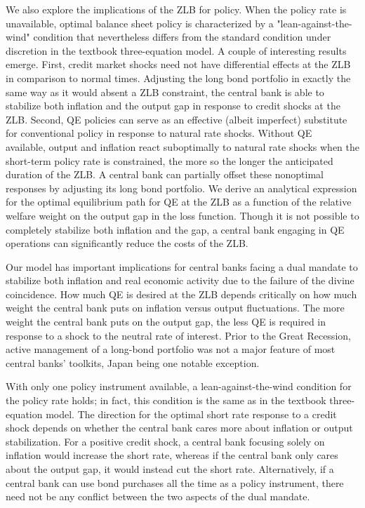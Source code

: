 \documentclass[10pt]{article}
\begin{document}
We also explore the implications of the ZLB for policy. When the policy rate is unavailable, optimal balance sheet policy is characterized by a "lean-against-the-wind" condition that nevertheless differs from the standard condition under discretion in the textbook three-equation model. A couple of interesting results emerge. First, credit market shocks need not have differential effects at the ZLB in comparison to normal times. Adjusting the long bond portfolio in exactly the same way as it would absent a ZLB constraint, the central bank is able to stabilize both inflation and the output gap in response to credit shocks at the ZLB. Second, QE policies can serve as an effective (albeit imperfect) substitute for conventional policy in response to natural rate shocks. Without QE\\
available, output and inflation react suboptimally to natural rate shocks when the short-term policy rate is constrained, the more so the longer the anticipated duration of the ZLB. A central bank can partially offset these nonoptimal responses by adjusting its long bond portfolio. We derive an analytical expression for the optimal equilibrium path for QE at the ZLB as a function of the relative welfare weight on the output gap in the loss function. Though it is not possible to completely stabilize both inflation and the gap, a central bank engaging in QE operations can significantly reduce the costs of the ZLB.

Our model has important implications for central banks facing a dual mandate to stabilize both inflation and real economic activity due to the failure of the divine coincidence. How much QE is desired at the ZLB depends critically on how much weight the central bank puts on inflation versus output fluctuations. The more weight the central bank puts on the output gap, the less QE is required in response to a shock to the neutral rate of interest. Prior to the Great Recession, active management of a long-bond portfolio was not a major feature of most central banks' toolkits, Japan being one notable exception.

With only one policy instrument available, a lean-against-the-wind condition for the policy rate holds; in fact, this condition is the same as in the textbook three-equation model. The direction for the optimal short rate response to a credit shock depends on whether the central bank cares more about inflation or output stabilization. For a positive credit shock, a central bank focusing solely on inflation would increase the short rate, whereas if the central bank only cares about the output gap, it would instead cut the short rate. Alternatively, if a central bank can use bond purchases all the time as a policy instrument, there need not be any conflict between the two aspects of the dual mandate.
\end{document}
